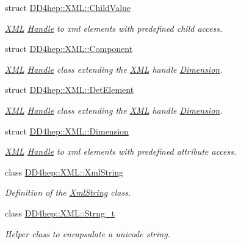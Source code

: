 \begin{DoxyCompactItemize}
struct \hyperlink{struct_d_d4hep_1_1_x_m_l_1_1_child_value}{D\+D4hep\+::\+X\+M\+L\+::\+Child\+Value}
\begin{DoxyCompactList}\small\item\em \hyperlink{namespace_d_d4hep_1_1_x_m_l}{X\+ML} \hyperlink{class_d_d4hep_1_1_handle}{Handle} to xml elements with predefined child access. \end{DoxyCompactList}\item 
struct \hyperlink{struct_d_d4hep_1_1_x_m_l_1_1_component}{D\+D4hep\+::\+X\+M\+L\+::\+Component}
\begin{DoxyCompactList}\small\item\em \hyperlink{namespace_d_d4hep_1_1_x_m_l}{X\+ML} \hyperlink{class_d_d4hep_1_1_handle}{Handle} class extending the \hyperlink{namespace_d_d4hep_1_1_x_m_l}{X\+ML} handle \hyperlink{struct_d_d4hep_1_1_x_m_l_1_1_dimension}{Dimension}. \end{DoxyCompactList}\item 
struct \hyperlink{struct_d_d4hep_1_1_x_m_l_1_1_det_element}{D\+D4hep\+::\+X\+M\+L\+::\+Det\+Element}
\begin{DoxyCompactList}\small\item\em \hyperlink{namespace_d_d4hep_1_1_x_m_l}{X\+ML} \hyperlink{class_d_d4hep_1_1_handle}{Handle} class extending the \hyperlink{namespace_d_d4hep_1_1_x_m_l}{X\+ML} handle \hyperlink{struct_d_d4hep_1_1_x_m_l_1_1_dimension}{Dimension}. \end{DoxyCompactList}\item 
struct \hyperlink{struct_d_d4hep_1_1_x_m_l_1_1_dimension}{D\+D4hep\+::\+X\+M\+L\+::\+Dimension}
\begin{DoxyCompactList}\small\item\em \hyperlink{namespace_d_d4hep_1_1_x_m_l}{X\+ML} \hyperlink{class_d_d4hep_1_1_handle}{Handle} to xml elements with predefined attribute access. \end{DoxyCompactList}\item 
class \hyperlink{class_d_d4hep_1_1_x_m_l_1_1_xml_string}{D\+D4hep\+::\+X\+M\+L\+::\+Xml\+String}
\begin{DoxyCompactList}\small\item\em Definition of the \hyperlink{class_d_d4hep_1_1_x_m_l_1_1_xml_string}{Xml\+String} class. \end{DoxyCompactList}\item 
class \hyperlink{class_d_d4hep_1_1_x_m_l_1_1_strng__t}{D\+D4hep\+::\+X\+M\+L\+::\+Strng\+\_\+t}
\begin{DoxyCompactList}\small\item\em Helper class to encapsulate a unicode string. \end{DoxyCompactList}\item 

\end{DoxyCompactItemize}

